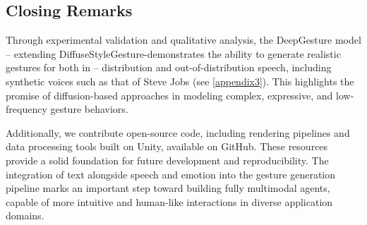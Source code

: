\subsection{Closing Remarks}

Through experimental validation and qualitative analysis, the DeepGesture model -- extending DiffuseStyleGesture-demonstrates the ability to generate realistic gestures for both in -- distribution and out-of-distribution speech, including synthetic voices such as that of Steve Jobs (see \autoref{appendix3}). This highlights the promise of diffusion-based approaches in modeling complex, expressive, and low-frequency gesture behaviors.

Additionally, we contribute open-source code, including rendering pipelines and data processing tools built on Unity, available on GitHub. These resources provide a solid foundation for future development and reproducibility. The integration of text alongside speech and emotion into the gesture generation pipeline marks an important step toward building fully multimodal agents, capable of more intuitive and human-like interactions in diverse application domains.

%


